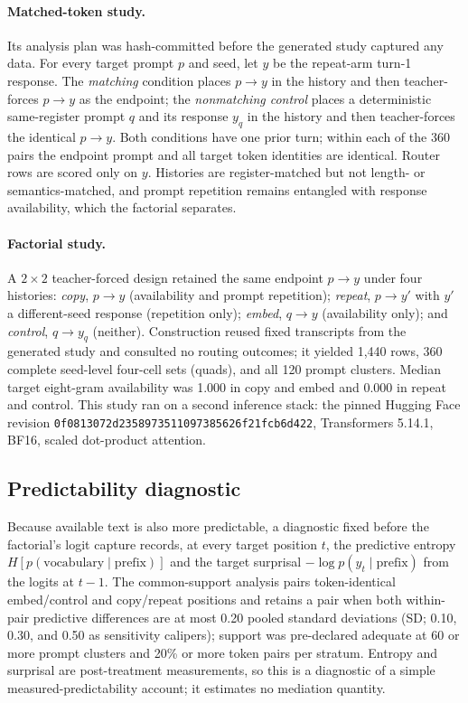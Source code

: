 \documentclass[10pt,a4paper,twocolumn]{article}
\begin{document}
\paragraph{Matched-token study.}
Its analysis plan was hash-committed before the generated study captured any
data. For every target prompt \(p\) and seed, let \(y\) be the repeat-arm
turn-1 response. The \emph{matching} condition places \(p\!\rightarrow\!y\) in
the history and then teacher-forces \(p\!\rightarrow\!y\) as the endpoint; the
\emph{nonmatching control} places a deterministic same-register prompt \(q\)
and its response \(y_q\) in the history and then teacher-forces the identical
\(p\!\rightarrow\!y\). Both conditions have one prior turn; within each of the
360 pairs the endpoint prompt and all target token identities are identical.
Router rows are scored only on \(y\). Histories are register-matched but not
length- or semantics-matched, and prompt repetition remains entangled with
response availability, which the factorial separates.

\paragraph{Factorial study.}
A \(2\times2\) teacher-forced design retained the same endpoint
\(p\!\rightarrow\!y\) under four histories: \emph{copy}, \(p\!\rightarrow\!y\)
(availability and prompt repetition); \emph{repeat}, \(p\!\rightarrow\!y'\)
with \(y'\) a different-seed response (repetition only); \emph{embed},
\(q\!\rightarrow\!y\) (availability only); and \emph{control},
\(q\!\rightarrow\!y_q\) (neither). Construction reused fixed transcripts from
the generated study and consulted no routing outcomes; it yielded 1,440 rows,
360 complete seed-level four-cell sets (quads), and all 120 prompt clusters. Median target
eight-gram availability was 1.000 in copy and embed and 0.000 in repeat and
control. This study ran on a second inference stack: the pinned Hugging Face
revision \texttt{0f0813072d2358973511097385626f21fcb6d422}, Transformers
5.14.1, BF16, scaled dot-product attention.

\subsection{Predictability diagnostic}

Because available text is also more predictable, a diagnostic fixed before the
factorial's logit capture records, at every target position \(t\), the
predictive entropy \(H[p(\text{vocabulary}\mid\text{prefix})]\) and the target
surprisal \(-\log p(y_t\mid\text{prefix})\) from the logits at \(t-1\). The
common-support analysis pairs token-identical embed/control and copy/repeat
positions and retains a pair when both within-pair predictive differences are
at most 0.20 pooled standard deviations (SD; 0.10, 0.30, and 0.50 as
sensitivity calipers); support was pre-declared adequate at 60 or more prompt clusters and
20\% or more token pairs per stratum. Entropy and surprisal are post-treatment
measurements, so this is a diagnostic of a simple measured-predictability
account; it estimates no mediation quantity.
\end{document}
